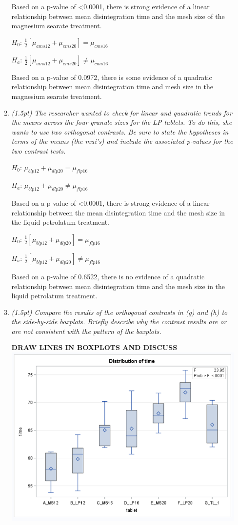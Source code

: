 \documentclass{article}\usepackage[]{graphicx}\usepackage[]{color}
\begin{document}
\begin{enumerate}
\begin{enumerate}
Based on a p-value of \textless 0.0001, there is strong evidence of a linear relationship between mean disintegration time and the mesh size of the magnesium searate treatment.

$H_{0}$: $\frac{1}{2}[\mu_{ams12} + \mu_{ems20}] = \mu_{cms16}$

$H_{a}$: $\frac{1}{2}[\mu_{ams12} + \mu_{ems20}] \neq \mu_{cms16}$ 

Based on a p-value of 0.0972, there is some evidence of a quadratic relationship between mean disintegration time and mesh size in the magnesium searate treatment.


\item
{\it  (1.5pt) The researcher wanted to check for linear and quadratic trends for the means across the four granule sizes for the LP tablets. To do this, she wants to use two orthogonal contrasts. Be sure to state the hypotheses in terms of the means (the mui's) and include the associated p-values for the two contrast tests.}

$H_{0}$: $\mu_{blp12} + \mu_{dlp20} = \mu_{flp16}$

$H_{a}$: $\mu_{blp12} + \mu_{dlp20} \neq \mu_{flp16}$

Based on a p-value of \textless 0.0001, there is strong evidence of a linear relationship between the mean disintegration time and the mesh size in the liquid petrolatum treatment.

$H_{0}$: $\frac{1}{2}[\mu_{blp12} + \mu_{dlp20}] = \mu_{flp16}$

$H_{a}$: $\frac{1}{2}[\mu_{blp12} + \mu_{dlp20}] \neq \mu_{flp16}$

Based on a p-value of 0.6522, there is no evidence of a quadratic relationship between mean disintegration time and the mesh size in the liquid petrolatum treatment. 


\item 
{\it (1.5pt) Compare the results of the orthogonal contrasts in (g) and (h) to the side-by-side boxplots. Briefly describe why the contrast results are or are not consistent with the pattern of the boxplots.}


{\bf DRAW LINES IN BOXPLOTS AND DISCUSS}
\includegraphics{boxplots}



\end{enumerate}
\end{enumerate}
\end{document}
